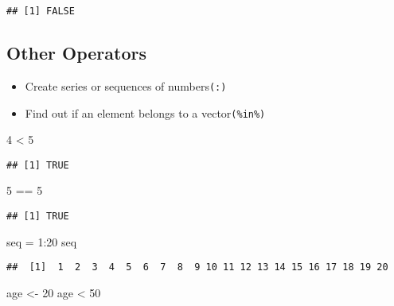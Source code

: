 \documentclass[
]{article}
\newenvironment{Shaded}{\begin{snugshade}}{\end{snugshade}}
\newcommand{\DecValTok}[1]{\textcolor[rgb]{0.00,0.00,0.81}{#1}}
\newcommand{\NormalTok}[1]{#1}
\newcommand{\OtherTok}[1]{\textcolor[rgb]{0.56,0.35,0.01}{#1}}
\newcommand{\SpecialCharTok}[1]{\textcolor[rgb]{0.00,0.00,0.00}{#1}}
\providecommand{\tightlist}{%
  \setlength{\itemsep}{0pt}\setlength{\parskip}{0pt}}
\begin{document}
\begin{verbatim}
## [1] FALSE
\end{verbatim}

\hypertarget{other-operators}{%
\subsection{Other Operators}\label{other-operators}}

\begin{itemize}
\tightlist
\item
  Create series or sequences of numbers\texttt{(:)}\\
\item
  Find out if an element belongs to a vector\texttt{(\%in\%)}
\end{itemize}

\begin{Shaded}
\begin{Highlighting}[]
\DecValTok{4} \SpecialCharTok{\textless{}} \DecValTok{5}
\end{Highlighting}
\end{Shaded}

\begin{verbatim}
## [1] TRUE
\end{verbatim}

\begin{Shaded}
\begin{Highlighting}[]
\DecValTok{5} \SpecialCharTok{==} \DecValTok{5}
\end{Highlighting}
\end{Shaded}

\begin{verbatim}
## [1] TRUE
\end{verbatim}

\begin{Shaded}
\begin{Highlighting}[]
\NormalTok{seq }\OtherTok{=} \DecValTok{1}\SpecialCharTok{:}\DecValTok{20}
\NormalTok{seq}
\end{Highlighting}
\end{Shaded}

\begin{verbatim}
##  [1]  1  2  3  4  5  6  7  8  9 10 11 12 13 14 15 16 17 18 19 20
\end{verbatim}

\begin{Shaded}
\begin{Highlighting}[]
\NormalTok{age }\OtherTok{\textless{}{-}} \DecValTok{20}
\NormalTok{age }\SpecialCharTok{\textless{}} \DecValTok{50}
\end{Highlighting}
\end{Shaded}
\end{document}
